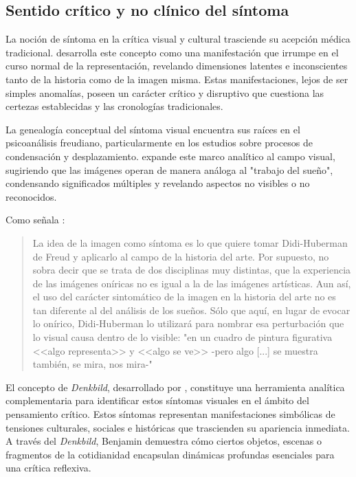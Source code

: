 \subsection*{Sentido crítico y no clínico del síntoma}

La noción de síntoma en la crítica visual y cultural trasciende su acepción médica tradicional. \parencite{DidiHuberman2011} desarrolla este concepto como una manifestación que irrumpe en el curso normal de la representación, revelando dimensiones latentes e inconscientes tanto de la historia como de la imagen misma. Estas manifestaciones, lejos de ser simples anomalías, poseen un carácter crítico y disruptivo que cuestiona las certezas establecidas y las cronologías tradicionales.

La genealogía conceptual del síntoma visual encuentra sus raíces en el psicoanálisis freudiano, particularmente en los estudios sobre procesos de condensación y desplazamiento. \parencite{DidiHuberman2011} expande este marco analítico al campo visual, sugiriendo que las imágenes operan de manera análoga al "trabajo del sueño", condensando significados múltiples y revelando aspectos no visibles o no reconocidos.

Como señala \parencite[p. 37]{VegaArevalo2017}:

\begin{quote}
    La idea de la imagen como síntoma es lo que quiere tomar Didi-Huberman de Freud y aplicarlo al campo de la historia del arte. Por supuesto, no sobra decir que se trata de dos disciplinas muy distintas, que la experiencia de las imágenes oníricas no es igual a la de las imágenes artísticas. Aun así, el uso del carácter sintomático de la imagen en la historia del arte no es tan diferente al del análisis de los sueños. Sólo que aquí, en lugar de evocar lo onírico, Didi-Huberman lo utilizará para nombrar esa perturbación que lo visual causa dentro de lo visible: "en un cuadro de pintura figurativa <<algo representa>> y <<algo se ve>> -pero algo [...] se muestra también, se mira, nos mira-"
\end{quote}

El concepto de \textit{Denkbild}, desarrollado por \parencite{Benjamin2004}, constituye una herramienta analítica complementaria para identificar estos síntomas visuales en el ámbito del pensamiento crítico. Estos síntomas representan manifestaciones simbólicas de tensiones culturales, sociales e históricas que trascienden su apariencia inmediata. A través del \textit{Denkbild}, Benjamin demuestra cómo ciertos objetos, escenas o fragmentos de la cotidianidad encapsulan dinámicas profundas esenciales para una crítica reflexiva.

